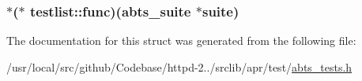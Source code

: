 \subsubsection[{\texorpdfstring{func}{func}}]{ $\ast$($\ast$ testlist\+::func)({\bf abts\+\_\+suite} $\ast$suite)}\hypertarget{structtestlist_acb880be9cb11bd3bffafeb246a24c846}{}\label{structtestlist_acb880be9cb11bd3bffafeb246a24c846}


The documentation for this struct was generated from the following file\+:\begin{DoxyCompactItemize}
\item 
/usr/local/src/github/\+Codebase/httpd-\/2../srclib/apr/test/\hyperlink{test_2abts__tests_8h}{abts\+\_\+tests.\+h}\end{DoxyCompactItemize}
